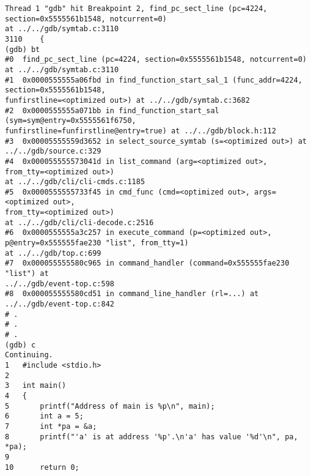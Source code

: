 \documentclass{report}
\begin{document}
\begin{verbatim}
Thread 1 "gdb" hit Breakpoint 2, find_pc_sect_line (pc=4224, 
section=0x5555561b1548, notcurrent=0)
at ../../gdb/symtab.c:3110
3110	{
(gdb) bt
#0  find_pc_sect_line (pc=4224, section=0x5555561b1548, notcurrent=0) 
at ../../gdb/symtab.c:3110
#1  0x0000555555a06fbd in find_function_start_sal_1 (func_addr=4224, 
section=0x5555561b1548, 
funfirstline=<optimized out>) at ../../gdb/symtab.c:3682
#2  0x0000555555a071bb in find_function_start_sal (sym=sym@entry=0x5555561f6750, 
funfirstline=funfirstline@entry=true) at ../../gdb/block.h:112
#3  0x00005555559d3652 in select_source_symtab (s=<optimized out>) at 
../../gdb/source.c:329
#4  0x000055555573041d in list_command (arg=<optimized out>, 
from_tty=<optimized out>)
at ../../gdb/cli/cli-cmds.c:1185
#5  0x0000555555733f45 in cmd_func (cmd=<optimized out>, args=<optimized out>, 
from_tty=<optimized out>)
at ../../gdb/cli/cli-decode.c:2516
#6  0x0000555555a3c257 in execute_command (p=<optimized out>, 
p@entry=0x555555fae230 "list", from_tty=1)
at ../../gdb/top.c:699
#7  0x000055555580c965 in command_handler (command=0x555555fae230 "list") at 
../../gdb/event-top.c:598
#8  0x000055555580cd51 in command_line_handler (rl=...) at 
../../gdb/event-top.c:842
# .
# .
# .
(gdb) c
Continuing.
1	#include <stdio.h>
2	
3	int main()
4	{
5		printf("Address of main is %p\n", main);
6		int a = 5;
7		int *pa = &a;
8		printf("'a' is at address '%p'.\n'a' has value '%d'\n", pa, *pa);
9	
10		return 0;

\end{verbatim}
\end{document}
